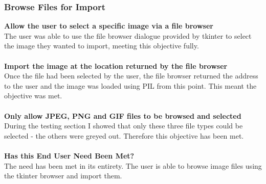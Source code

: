 \documentclass[titlepage]{article}
\begin{document}
\subsubsection{Browse Files for Import}
\textbf{Allow the user to select a specific image via a file browser}\\
The user was able to use the file browser dialogue provided by tkinter to select the image they wanted to import, meeting this objective fully.\\\\
\textbf{Import the image at the location returned by the file browser}\\
Once the file had been selected by the user, the file browser returned the address to the user and the image was loaded using PIL from this point. This meant the objective was met.\\\\
\textbf{Only allow JPEG, PNG and GIF files to be browsed and selected}\\
During the testing section I showed that only these three file types could be selected - the others were greyed out. Therefore this objective has been met.\\\\
\textbf{Has this End User Need Been Met?}\\
The need has been met in its entirety. The user is able to browse image files using the tkinter browser and import them. 
\end{document}
